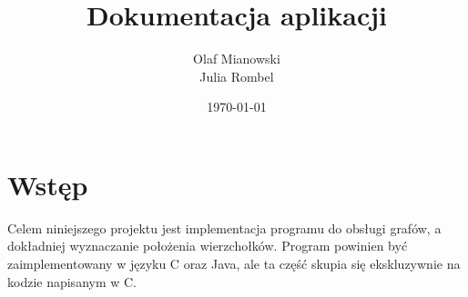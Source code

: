 \documentclass[12pt]{article}
\title{Dokumentacja aplikacji}
\author{Olaf Mianowski \\ Julia Rombel}
\date{\today}
\begin{document}
\maketitle

\section{Wstęp}
Celem niniejszego projektu jest implementacja programu do obsługi grafów, a dokładniej wyznaczanie położenia wierzchołków. Program powinien być zaimplementowany w języku C oraz Java, ale ta część skupia się ekskluzywnie na kodzie napisanym w C.
\end{document}
